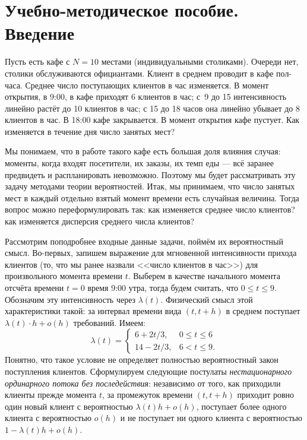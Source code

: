 \documentclass[14pt]{extarticle}
\theoremstyle{theorem}
\theoremstyle{remark}
\begin{document}
\newpage
\section{Учебно-методическое пособие. Введение}

Пусть есть кафе с $N=10$ местами (индивидуальными столиками). Очереди нет,
столики обслуживаются официантами. Клиент в среднем
проводит в кафе пол-часа. Среднее число поступающих клиентов в час изменяется. В
момент открытия, в 9:00, в кафе приходят 6 клиентов в час; с~9 до 15 интенсивность
линейно растёт до 10 клиентов в час; с 15 до 18 часов она линейно убывает до 8
клиентов в час. В 18:00 кафе закрывается. В момент открытия кафе пустует. Как
изменяется в течение дня число занятых мест?

Мы понимаем, что в работе такого кафе есть большая доля влияния случая: моменты,
когда входят посетители, их заказы, их темп еды --- всё заранее предвидеть и
распланировать невозможно. Поэтому мы будет рассматривать эту задачу методами
теории вероятностей. Итак, мы принимаем, что число занятых мест в каждый
отдельно взятый момент времени есть случайная величина. Тогда вопрос можно
переформулировать так: как изменяется среднее число клиентов? как изменяется
дисперсия среднего числа клиентов?

Рассмотрим поподробнее входные данные задачи, поймём их вероятностный
смысл. Во-первых, запишем выражение для мгновенной интенсивности прихода
клиентов (то, что мы ранее назвали <<число клиентов в час>>) для произвольного
момента времени $t$. Выберем в качестве начального момента отсчёта времени $t=0$
время 9:00 утра, тогда будем считать, что $0\leq t\leq 9$. Обозначим эту
интенсивность через $\lambda(t)$. Физический смысл этой характеристики такой: за
интервал времени вида $(t, t+h)$ в среднем поступает $\lambda(t)\cdot h+o(h)$
требований.  Имеем:
\[
\lambda(t)=\begin{cases}
  6+2t/3,& 0\leq t\leq 6\\
  14-2t/3,& 6< t \leq 9.
\end{cases}
\]
Понятно, что такое
условие не определяет полностью вероятностный закон поступления
клиентов. Сформулируем следующие постулаты \emph{нестационарного ординарного
  потока без последействия}: независимо от того, как приходили клиенты прежде
момента $t$, за промежуток времени $(t, t+h)$ приходит ровно один новый клиент с
вероятностью $\lambda(t)h+o(h)$, поступает более одного клиента с
вероятностью $o(h)$ и не поступает ни одного клиента с вероятностью
$1-\lambda(t)h+o(h)$. 
\end{document}
